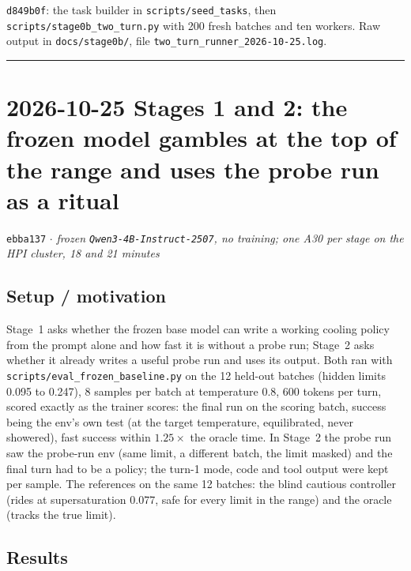 \documentclass[11pt,a4paper]{article}
\newcommand{\commit}[1]{\texttt{\textcolor{commitgray}{#1}}}
\begin{document}
\begin{sloppypar}
\commit{d849b0f}: the task builder in \texttt{scripts/seed\_tasks}, then
\texttt{scripts/stage0b\_two\_turn.py} with 200 fresh batches and ten
workers. Raw output in \texttt{docs/stage0b/}, file
\texttt{two\_turn\_runner\_2026-10-25.log}.
\end{sloppypar}

\bigskip
\hrule
\bigskip

\section*{2026-10-25 \quad Stages 1 and 2: the frozen model gambles at the top
of the range and uses the probe run as a ritual}

\commit{ebba137} $\cdot$ \textit{frozen \texttt{Qwen3-4B-Instruct-2507}, no
training; one A30 per stage on the HPI cluster, 18 and 21 minutes}

\subsection*{Setup / motivation}

Stage~1 asks whether the frozen base model can write a working cooling policy
from the prompt alone and how fast it is without a probe run; Stage~2 asks
whether it already writes a useful probe run and uses its output. Both ran
with \texttt{scripts/eval\_frozen\_baseline.py} on the 12 held-out batches
(hidden limits 0.095 to 0.247), 8 samples per batch at temperature 0.8, 600
tokens per turn, scored exactly as the trainer scores: the final run on the
scoring batch, success being the env's own test (at the target temperature,
equilibrated, never showered), fast success within $1.25\times$ the oracle
time. In Stage~2 the probe run saw the probe-run env (same limit, a different
batch, the limit masked) and the final turn had to be a policy; the turn-1
mode, code and tool output were kept per sample. The references on the same
12 batches: the blind cautious controller (rides at supersaturation 0.077,
safe for every limit in the range) and the oracle (tracks the true limit).

\subsection*{Results}
\end{document}
